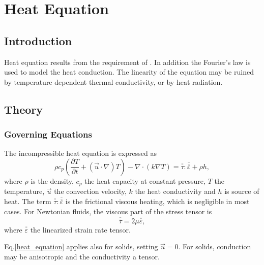 \chapter{Heat Equation}


\begin{versiona}


\section{Introduction}

Heat equation results from the requirement of .
In addition the Fourier's law is used to model
the heat conduction. The linearity of the equation may be 
ruined by temperature dependent thermal conductivity, or by
heat radiation.


\section{Theory}

\subsection{Governing Equations}
The incompressible heat equation is expressed as
\begin{equation}
\rho  c_p\left( \frac{\partial T}{\partial t}+(\vec u\cdot\nabla) T\right) - 
\nabla\cdot(k\nabla T) =
\overline{\overline\tau}:\overline{\overline \varepsilon} + \rho h,
\label{heat_equation}
\end{equation}
where $\rho$ is the density, $c_p$ the heat capacity at constant pressure, 
$T$ the temperature, $\vec u$ the convection velocity, $k$ the heat 
conductivity and $h$ is source of heat.
The term $\overline{\overline\tau}:\overline{\overline \varepsilon}$ is the
frictional viscous heating, which is negligible in most cases. For Newtonian
fluids, the viscous
part of the stress tensor is
\begin{equation}
\overline{\overline\tau} = 2\mu \overline{\overline\varepsilon},
\end{equation}
where $\overline{\overline \varepsilon}$ the linearized strain rate tensor.

Eq.\ref{heat_equation} applies also for solids, setting $\vec u = 0$. For
solids, conduction may be anisotropic and the conductivity a tensor.


\end{versiona}
